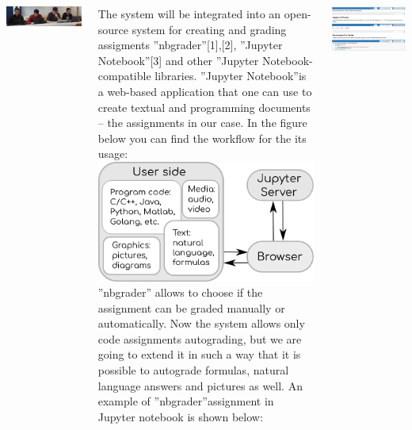 \documentclass[25pt, 
               a0paper, 
               portraitmargin = 0mm, 
               margin = 0mm,
               innermargin = 50mm,
               blockverticalspace = 1mm,
               colspace = 40mm,
               subcolspace = 8mm]
               {tikzposter}
\begin{document}
\begin{columns}
{\includegraphics[width=\linewidth]{images/students.jpg}

    }
    {
\LARGE
The system will be integrated into an
open-source system for creating and grading
assigments ”nbgrader”[1],[2], ”Jupyter Notebook”[3] and
other ”Jupyter Notebook-compatible libraries.
”Jupyter Notebook”is a web-based application that one
can use to create textual and programming documents
– the assignments in our case. In the figure below you
can find the workflow for the its usage:    \\ 
     
    	        \includegraphics[width=0.9\linewidth]{images/jupyter.png}
”nbgrader” allows to choose if the assignment can be
graded manually or automatically. Now the system
allows only code assignments autograding, but we are
going to extend it in such a way that it is possible to
autograde formulas, natural language answers and
pictures as well. An example of ”nbgrader”assignment
in Jupyter notebook is shown below: \\
\begin{center}
	        \includegraphics[width=\linewidth]{images/nbgrader}
\end{center}
	}  
   

\end{columns}
\end{document}
